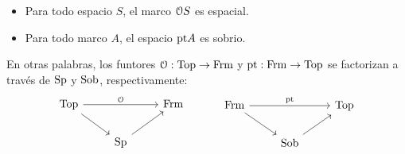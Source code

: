 \begin{lemma}
    \leavevmode
    \begin{itemize}
        \item Para todo espacio $S$,
            el marco $\cal OS$ es espacial.
        \item Para todo marco $A$,
            el espacio $\pt A$ es sobrio.
    \end{itemize}
    En otras palabras, los funtores
    $\cal O:\Top\to\Frm$ y $\pt:\Frm\to\Top$ se factorizan
    a través de $\Sp$ y $\Sob$, respectivamente:
    \[
        \begin{tikzcd}
            \Top \ar[rr,"\cal O"] \ar[dr] && \Frm \\
            & \Sp \ar[ur]
        \end{tikzcd}
        \hspace{10mm}
        \begin{tikzcd}
            \Frm \ar[rr,"\pt"] \ar[dr] && \Top \\
            & \Sob \ar[ur]
        \end{tikzcd}
    \]
\end{lemma}
